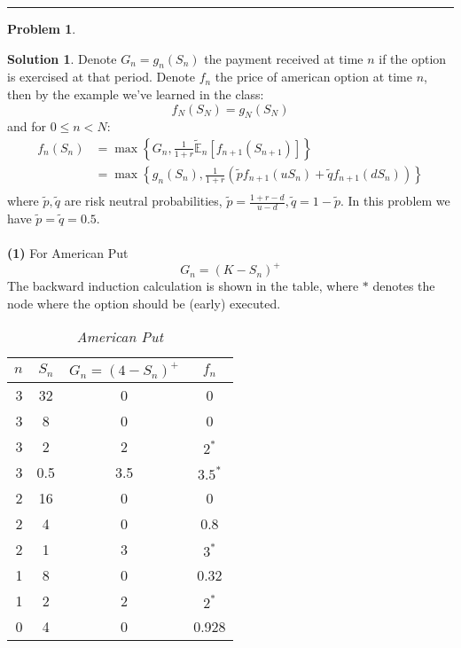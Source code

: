 \documentclass[a4paper, 10pt]{article}
\renewcommand{\arraystretch}{1.4}
\theoremstyle{definition}
\newtheorem{problem}{Problem}
\theoremstyle{hSol}
\newtheorem*{solution}{Solution}
\begin{document}
\noindent\rule{16cm}{0.4pt}
\begin{problem} 
\end{problem}
\begin{solution} Denote $G_n=g_n(S_n)$ the payment received at time $n$ if the option is exercised at that period. Denote $f_n$ the price of american option at time $n$, then by the example we've learned in the class:
\begin{equation}
  f_N(S_N) = g_N(S_N)
\end{equation}
and for $0\leq n<N$:
\begin{equation}
  \begin{split}
    f_n(S_n) &= \max\left\{G_n, \tfrac{1}{1+r}\tilde{\mathbb{E}}_n\left[f_{n+1}(S_{n+1})\right]\right\}\\
    &= \max\left\{g_n(S_n), \tfrac{1}{1+r}\left(\tilde{p}f_{n+1}(uS_n)+\tilde{q}f_{n+1}(dS_n)\right)\right\}\\
  \end{split}
\end{equation}
where $\tilde{p}, \tilde{q}$ are risk neutral probabilities, $\tilde{p}=\frac{1+r-d}{u-d}, \tilde{q}=1- \tilde{p}$. In this problem we have $\tilde{p}=\tilde{q}=0.5$. \\
~\\
\textbf{(1)} For American Put
$$
G_n = (K - S_n)^+
$$
The backward induction calculation is shown in the table, where $*$ denotes the node where the option should be (early) executed.
\begin{table}[h]
\vspace{-10pt}
\caption{\textit{American Put}}
\vspace{3pt}
\centering
\def\arraystretch{1.15}
\begin{tabular}{|r|ccc|}
\hline
$n$ & $S_n$ & $G_n=(4-S_n)^+$ & $f_n$\\ 
\hline
3 & 32 & 0 & 0\\
3 & 8 & 0& 0\\
3 & 2 & 2 & $2^*$\\
3 & 0.5 & 3.5 & $3.5^*$\\
\hline
2 & 16 & 0 & 0\\
2 & 4 & 0& 0.8\\
2 & 1 & 3 & $3^*$\\
\hline
1 & 8 & 0 & 0.32\\
1 & 2 & 2 & $2^*$\\
\hline 
0 & 4 & 0 & 0.928\\
\hline
\end{tabular}

\end{table}
\end{solution}
\end{document}
